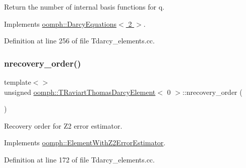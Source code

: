 Return the number of internal basis functions for q. 



Implements \hyperlink{classoomph_1_1DarcyEquations_ad1836d0919835cd1d5f6af654ca03a52}{oomph\+::\+Darcy\+Equations$<$ 2 $>$}.



Definition at line 256 of file Tdarcy\+\_\+elements.\+cc.

\mbox{\label{classoomph_1_1TRaviartThomasDarcyElement_ad885944cc8b00dec57f3f8178e41183f}} 
\subsubsection{\texorpdfstring{nrecovery\+\_\+order()}{nrecovery\_order()}\hspace{0.1cm}{\footnotesize\ttfamily [1/3]}}
{\footnotesize\ttfamily template$<$$>$ \\
unsigned \hyperlink{classoomph_1_1TRaviartThomasDarcyElement}{oomph\+::\+T\+Raviart\+Thomas\+Darcy\+Element}$<$ 0 $>$\+::nrecovery\+\_\+order (\begin{DoxyParamCaption}{ }\end{DoxyParamCaption})\hspace{0.3cm}{\ttfamily [virtual]}}



Recovery order for Z2 error estimator. 



Implements \hyperlink{classoomph_1_1ElementWithZ2ErrorEstimator_af39480835bd3e0f6b2f4f7a9a4044798}{oomph\+::\+Element\+With\+Z2\+Error\+Estimator}.



Definition at line 172 of file Tdarcy\+\_\+elements.\+cc.

\mbox{\label{classoomph_1_1TRaviartThomasDarcyElement_a95e48e5070eeb89215bfb39c1d9c5989}} 
